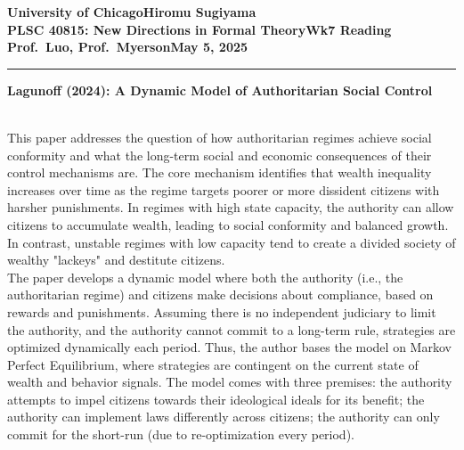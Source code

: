 \documentclass[10pt]{article}    %
\newcommand{\myname}{Hiromu Sugiyama}
\newcommand{\assignment}{Wk7 Reading}
\newcommand{\duedate}{May 5, 2025}
\begin{document}
\textbf{University of Chicago}\hfill\textbf{\myname}\\[0.01in]
\textbf{PLSC 40815: New Directions in Formal Theory}\hfill\textbf{\assignment}\\[0.01in]
\textbf{Prof.\ Luo, Prof.\ Myerson}\hfill\textbf{\duedate}\\
\smallskip\hrule\bigskip

\textbf{Lagunoff (2024): A Dynamic Model of Authoritarian Social Control} \par
\\
This paper addresses the question of how authoritarian regimes achieve social conformity and what the long-term social and economic consequences of their control mechanisms are. The core mechanism identifies that wealth inequality increases over time as the regime targets poorer or more dissident citizens with harsher punishments. In regimes with high state capacity, the authority can allow citizens to accumulate wealth, leading to social conformity and balanced growth. In contrast, unstable regimes with low capacity tend to create a divided society of wealthy "lackeys" and destitute citizens. \\
The paper develops a dynamic model where both the authority (i.e., the authoritarian regime) and citizens make decisions about compliance, based on rewards and punishments. Assuming there is no independent judiciary to limit the authority, and the authority cannot commit to a long-term rule, strategies are optimized dynamically each period. Thus, the author bases the model on Markov Perfect Equilibrium, where strategies are contingent on the current state of wealth and behavior signals. The model comes with three premises: the authority attempts to impel citizens towards their ideological ideals for its benefit; the authority can implement laws differently across citizens; the authority can only commit for the short-run (due to re-optimization every period). \\
\end{document}
